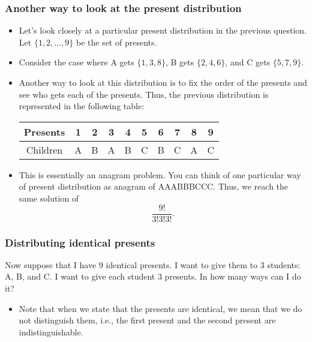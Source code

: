\begin{frame}\frametitle{Another way to look at the present distribution}
  \begin{itemize}
  \item Let's look closely at a particular present distribution in the
    previous question.  Let $\{1,2,\ldots,9\}$ be the set of presents.
  \item Consider the case where A gets $\{1,3,8\}$, B gets
    $\{2,4,6\}$, and C gets $\{5,7,9\}$. \pause
  \item Another way to look at this distribution is to fix the order
    of the presents and see who gets each of the presents.  Thus, the
    previous distribution is represented in the following table:
    \begin{tabular}{|c|c|c|c|c|c|c|c|c|c|}
      Presents & 1 & 2 & 3 & 4 & 5 & 6 & 7 & 8 & 9\\ \hline
      Children & A & B & A & B & C & B & C & A & C
    \end{tabular}
  \item \pause This is essentially an anagram problem.  You can think
    of one particular way of present distribution as anagram of
    AAABBBCCC.  Thus, we reach the same solution of
    \[\frac{9!}{3!3!3!}.\]
  \end{itemize}
\end{frame}

\begin{frame}\frametitle{Distributing identical presents}
  \begin{tcolorbox}
    Now suppose that I have $9$ identical presents.  I want to give
    them to $3$ students: A, B, and C.  I want to give each student
    $3$ presents.  In how many ways can I do it?
  \end{tcolorbox}
  \begin{itemize}
  \item Note that when we state that the presents are identical, we
    mean that we do not distinguish them, i.e., the first present and
    the second present are indistinguishable.
  \end{itemize}
  \vspace{1in}
\end{frame}

